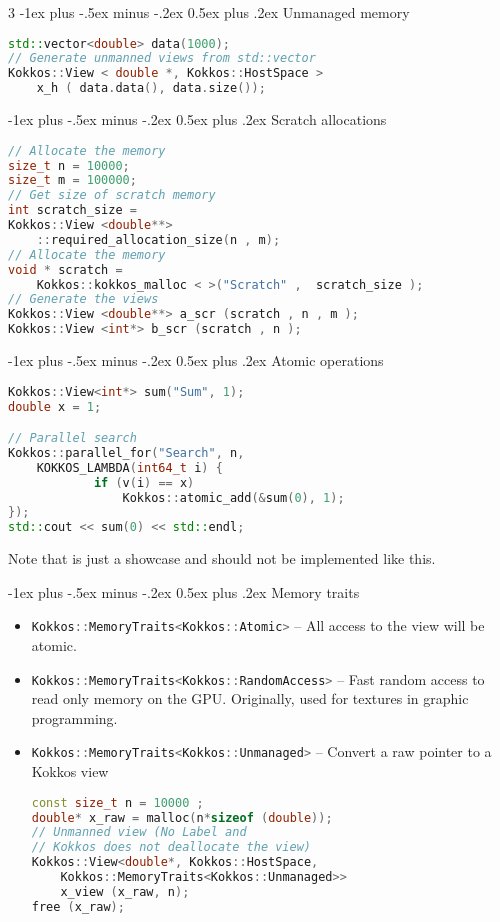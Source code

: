\documentclass[10pt,landscape]{article}
\makeatletter
\renewcommand{\section}{\@startsection{section}{1}{0mm}%
                                {-1ex plus -.5ex minus -.2ex}%
                                {0.5ex plus .2ex}%
                                {\normalfont\large\bfseries}}
\newcommand{\cpp}[1]{\lstinline[language=c++]{#1}}
\makeatother
\begin{document}
\begin{multicols}{3}
\section{Unmanaged memory}
\begin{lstlisting}[language=c++,style=mystyle]
std::vector<double> data(1000);
// Generate unmanned views from std::vector
Kokkos::View < double *, Kokkos::HostSpace > 
	x_h ( data.data(), data.size());
\end{lstlisting} 

\section{Scratch allocations}

\begin{lstlisting}[language=c++,style=mystyle]
// Allocate the memory
size_t n = 10000;
size_t m = 100000;
// Get size of scratch memory
int scratch_size =
Kokkos::View <double**>
	::required_allocation_size(n , m);
// Allocate the memory
void * scratch =
	Kokkos::kokkos_malloc < >("Scratch" ,  scratch_size );
// Generate the views
Kokkos::View <double**> a_scr (scratch , n , m );
Kokkos::View <int*> b_scr (scratch , n );
\end{lstlisting}

\section{Atomic operations}

\begin{lstlisting}[language=c++,style=mystyle]
Kokkos::View<int*> sum("Sum", 1);
double x = 1;

// Parallel search
Kokkos::parallel_for("Search", n, 
	KOKKOS_LAMBDA(int64_t i) {
			if (v(i) == x) 
				Kokkos::atomic_add(&sum(0), 1);
});
std::cout << sum(0) << std::endl;
\end{lstlisting} 
Note that is just a showcase and should not be implemented like this.

\section{Memory traits}
\begin{itemize}
\item \cpp{Kokkos::MemoryTraits<Kokkos::Atomic>} -- All access to the view will be atomic.
 \item \cpp{Kokkos::MemoryTraits<Kokkos::RandomAccess>} -- Fast random access to read only memory on the GPU. Originally, used for textures in graphic programming.  
 \item \cpp{Kokkos::MemoryTraits<Kokkos::Unmanaged>} -- Convert a raw pointer to a Kokkos view
 \begin{lstlisting}[language=c++,style=mystyle]
const size_t n = 10000 ;
double* x_raw = malloc(n*sizeof (double));
// Unmanned view (No Label and 
// Kokkos does not deallocate the view)
Kokkos::View<double*, Kokkos::HostSpace, 
	Kokkos::MemoryTraits<Kokkos::Unmanaged>>
    x_view (x_raw, n);
free (x_raw);
\end{lstlisting} 
 \end{itemize}


\end{multicols}
\end{document}
